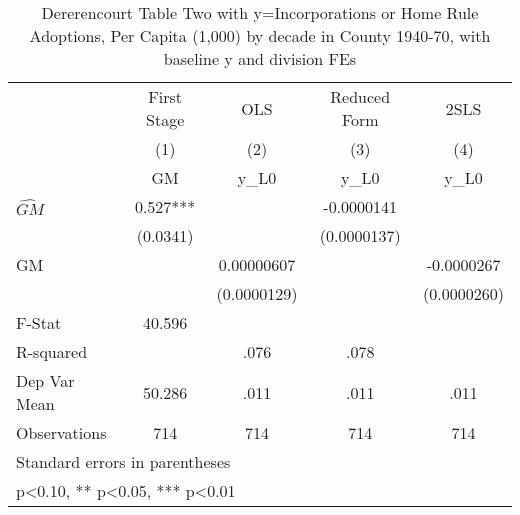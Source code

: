 \begin{table}[htbp]\centering
\def\sym#1{\ifmmode^{#1}\else\(^{#1}\)\fi}
\caption{Dererencourt Table Two with y=Incorporations or Home Rule Adoptions, Per Capita (1,000) by decade in County 1940-70, with baseline y and division FEs}
\begin{tabular}{l*{4}{c}}
\toprule
                    & First Stage   &         OLS   &Reduced Form   &        2SLS   \\
                    &\multicolumn{1}{c}{(1)}&\multicolumn{1}{c}{(2)}&\multicolumn{1}{c}{(3)}&\multicolumn{1}{c}{(4)}\\
                    &\multicolumn{1}{c}{GM}&\multicolumn{1}{c}{y\_L0}&\multicolumn{1}{c}{y\_L0}&\multicolumn{1}{c}{y\_L0}\\
\midrule
$\hat{GM}$          &       0.527***&               &  -0.0000141   &               \\
                    &    (0.0341)   &               & (0.0000137)   &               \\
\addlinespace
GM                  &               &  0.00000607   &               &  -0.0000267   \\
                    &               & (0.0000129)   &               & (0.0000260)   \\
\midrule
F-Stat              &      40.596   &               &               &               \\
R-squared           &               &        .076   &        .078   &               \\
Dep Var Mean        &      50.286   &        .011   &        .011   &        .011   \\
Observations        &         714   &         714   &         714   &         714   \\
\bottomrule
\multicolumn{5}{l}{\footnotesize Standard errors in parentheses}\\
\multicolumn{5}{l}{\footnotesize * p<0.10, ** p<0.05, *** p<0.01}\\
\end{tabular}
\end{table}
